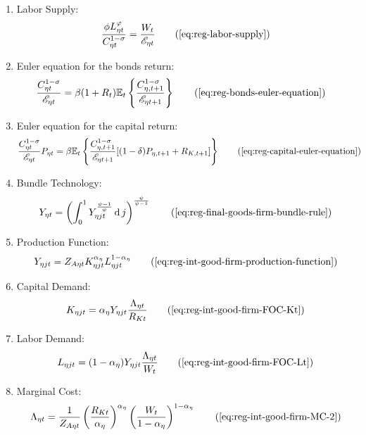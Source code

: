 \documentclass[
thesis.tex
]{subfiles}
\begin{document}
{\begin{itemize}
\begin{enumerate}
		\item Labor Supply:
		\begin{align}
			\frac{\phi L_{\eta t}^{\varphi}}{C_{\eta t}^{1-\sigma}} = \frac{W_t}{\te} \tag{\ref{eq:reg-labor-supply}}
		\end{align}

		\item Euler equation for the bonds return:
		\begin{align}
			\frac{ C_{\eta t}^{1-\sigma}}{ \te} &= \beta (1 + R_{t}) \E \left\{ \frac{ C_{\eta, t+1}^{1-\sigma}}{ \te[t+1]} \right\} \tag{\ref{eq:reg-bonds-euler-equation}}
		\end{align}
		
		\item Euler equation for the capital return:
		\begin{align}
			\frac{ C_{\eta t}^{1-\sigma}}{ \te} P_{\eta t} &= \beta \mathbb{E}_t \left\{ \frac{ C_{\eta, t+1}^{1-\sigma}}{ \te[t+1]} [(1-\delta) P_{\eta, t+1} + R_{K,t+1}] \right\} \tag{\ref{eq:reg-capital-euler-equation}}
		\end{align}
					
		\item Bundle Technology:
		\begin{align}
			Y_{\eta t} = \left( \int_{0}^{1} Y_{\eta jt}^{\frac{\psi-1}{\psi}} \dif j \right)^{\frac{\psi}{\psi-1}} \tag{\ref{eq:reg-final-goods-firm-bundle-rule}}
		\end{align}
		
		\item Production Function:
		\begin{align}
			Y_{\eta jt} = Z_{A\eta t} K_{\eta jt}^{\alpha_{\eta}} L_{\eta jt}^{1-{\alpha_{\eta}}} \tag{\ref{eq:reg-int-good-firm-production-function}}
		\end{align}
		
		\item Capital Demand:
		\begin{align}
			K_{\eta jt} = {\alpha_{\eta}} Y_{\eta jt} \frac{\Lambda_{\eta t}}{R_{Kt}} \tag{\ref{eq:reg-int-good-firm-FOC-Kt}}
		\end{align}
		
		\item Labor Demand:
		\begin{align}
			L_{\eta jt} = (1-{\alpha_{\eta}}) Y_{\eta jt} \frac{\Lambda_{\eta t}}{W_t} \tag{\ref{eq:reg-int-good-firm-FOC-Lt}}
		\end{align}
		
		\item Marginal Cost:
		\begin{align}
			\Lambda_{\eta t} = \frac{1}{Z_{A\eta t}} \left( \frac{R_{Kt}}{{\alpha_{\eta}}} \right)^{{\alpha_{\eta}}} \left( \frac{W_t}{1-{\alpha_{\eta}}} \right)^{1-{\alpha_{\eta}}} \tag{\ref{eq:reg-int-good-firm-MC-2}}
		\end{align}
		

\end{enumerate}
\end{itemize}}
\end{document}
